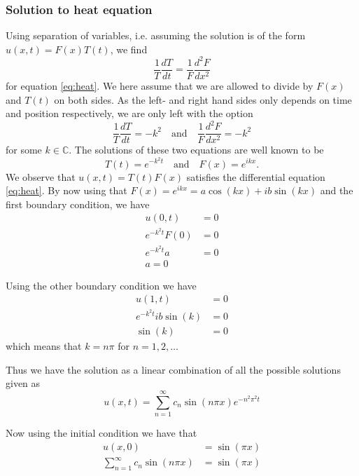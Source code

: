 \documentclass[aps,reprint,superscriptaddress,nofootinbib]{revtex4-2}
\begin{document}
    \subsubsection{Solution to heat equation}
    Using separation of variables, i.e. assuming the solution is of the form \(u(x,t)=F(x)T(t)\), we find
    \begin{equation*}
        \frac{1}{T}\frac{dT}{dt}=\frac{1}{F}\frac{d^2F}{dx^2}
    \end{equation*}
    for equation \eqref{eq:heat}. We here assume that we are allowed to divide by \(F(x)\) and \(T(t)\) on both sides. As the left- and right hand sides only depends on time and position respectively, we are only left with the option
    \begin{equation*}
        \frac{1}{T}\frac{dT}{dt}=-k^2\quad\text{and}\quad\frac{1}{F}\frac{d^2F}{dx^2}=-k^2
    \end{equation*}
    for some \(k\in\mathbb{C}\). The solutions of these two equations are well known to be
    \begin{equation*}
        T(t)=e^{-k^2t}\quad\text{and}\quad F(x)=e^{ikx}.
    \end{equation*}
    We observe that \(u(x,t)=T(t)F(x)\) satisfies the differential equation \eqref{eq:heat}. By now using that $F(x) = e^{ikx} = a \cos(kx) + ib\sin(kx)$ and the first boundary condition, we have
    \begin{align*}
        u(0, t) &= 0\\
        e^{-k^2t}F(0) &= 0 \\
        e^{-k^2t}a &= 0 \\
        a = 0
    \end{align*}
    
    Using the other boundary condition we have
    \begin{align*}
        u(1, t) &= 0 \\
        e^{-k^2t}ib\sin(k) &= 0 \\
        \sin(k) &= 0
    \end{align*}
    which means that $k = n\pi$ for $n = 1, 2, \dots$
    
    Thus we have the solution as a linear combination of all the possible solutions given as
    \begin{equation*}
        u(x, t) = \sum_{n=1}^\infty c_n\sin(n\pi x)e^{-n^2\pi^2t}
    \end{equation*}
    
    Now using the initial condition we have that
    \begin{align*}
        u(x, 0) &= \sin(\pi x) \\
        \sum_{n=1}^\infty c_n\sin(n\pi x) &= \sin(\pi x)
    \end{align*}
    
\end{document}
